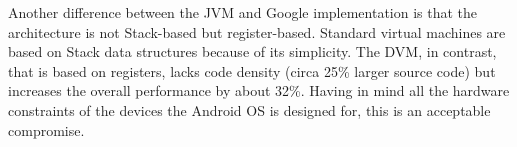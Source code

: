 Another difference between the JVM and Google implementation is that
the architecture is not Stack-based but register-based. Standard
virtual machines are based on Stack data structures because of its
simplicity. The DVM, in contrast, that is based on registers, lacks
code density (circa 25\% larger source code) but increases the overall
performance by about 32\%. Having in mind all the hardware constraints
of the devices the Android OS is designed for, this is an acceptable
compromise.
